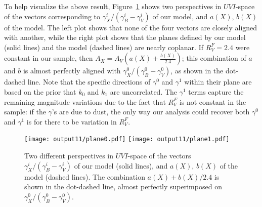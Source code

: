 \documentclass{aastex61}   	%
\begin{document}
\color{red}
To help visualize the above result, Figure~\ref{plane:fig} shows two perspectives in $UVI$-space
of the vectors corresponding to $\gamma^i_X/(\gamma^i_B-\gamma^i_V)$ of our model,
and $a(X)$, $b(X)$ of the  model.
The left plot shows that none of the four vectors are closely aligned with another, while the right plot shows that
the planes defined by our model (solid lines) and the   model (dashed lines) are nearly coplanar.
If $R^F_V=2.4$ were constant in our sample, then $A_X = A_V\left(a(X) + \frac{b(X)}{2.4}\right)$;  this combination of $a$ and $b$ is
almost perfectly aligned with $\gamma^0_X/(\gamma^0_B-\gamma^0_V)$, as shown in the dot-dashed line. 
\color{blue}
Note that the specific directions of $\gamma^0$ and
 $\gamma^1$  within their plane are based on the prior that $k_0$ and $k_1$ are uncorrelated.
\color{black}
The $\gamma^1$ terms capture the remaining magnitude variations due to the fact that $R^F_V$ is not constant in the sample:
if the $\gamma$'s are due to   dust, the only way our analysis could recover
both $\gamma^0$ and $\gamma^1$ is for there to be variation in $R^F_V$.


\begin{figure}[htbp] %
   \centering
   \texttt{[image: output11/plane0.pdf]}
   \texttt{[image: output11/plane1.pdf]}
   \caption{
   \color{red}
   Two different perspectives in $UVI$-space of the vectors $\gamma^i_X/(\gamma^i_B-\gamma^i_V)$ of our model (solid lines),
   and $a(X)$, $b(X)$ of the  model (dashed lines).  The combination $a(X)+b(X)/2.4$ is shown in the dot-dashed
   line, almost perfectly superimposed on $\gamma^0_X/(\gamma^0_B-\gamma^0_V)$.
   \color{black}
   \label{plane:fig}}
\end{figure}



\color{black}
\end{document}
